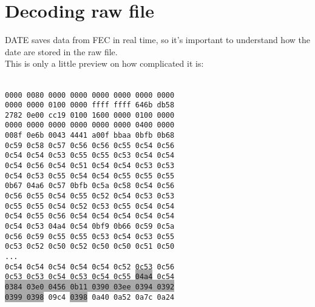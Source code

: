 \documentclass[a4paper,12pt]{article}
\begin{document}
 	\section{Decoding raw file}
 		DATE saves data from FEC in real time, so it's important to understand how the date are stored in the raw file.\\
 		This is only a little preview on how complicated it is:\\
 		\vspace{0.2cm}\\
 		{\scriptsize
 		\begin{minipage}[c]{0.49\textwidth}
			\texttt{0000 0080 0000 0000 0000 0000 0000 0000\\
			0000 0000 0100 0000 ffff ffff 646b db58\\
			2782 0e00 cc19 0100 1600 0000 0100 0000\\
			0000 0000 0000 0000 0000 0000 0400 0000\\
			008f 0e6b {\color{lime}00}{\color{blue}43 4441} {\color{pink}a00f bbaa} {\color{red}0bfb 0b68\\
			0c59 0c58 0c57 0c56 0c56 0c55 0c54 0c56\\
			0c54 0c54 0c53 0c55 0c55 0c53 0c54 0c54\\
			0c54 0c56 0c54 0c51 0c54 0c54 0c53 0c53\\
			0c54 0c53 0c55 0c54 0c54 0c55 0c55 0c55\\
			0b67} {\color{green}04a6} {\color{red}0c57 0bfb 0c5a 0c58 0c54 0c56\\
			0c56 0c55 0c54 0c55 0c52 0c54 0c53 0c53\\
			0c55 0c55 0c54 0c52 0c53 0c55 0c54 0c54\\
			0c54 0c55 0c56 0c54 0c54 0c54 0c54 0c54\\
			0c54 0c53} {\color{green}04a4} {\color{red}0c54 0bf9 0b66 0c59 0c5a\\
			0c56 0c59 0c55 0c55 0c53 0c54 0c53 0c55\\
			0c53 0c52 0c50 0c52 0c50 0c50 0c51 0c50\\
			...\\
			0c54 0c54 0c54 0c54 0c54 0c52 0c53 0c56\\
			0c53 0c53 0c54 0c53 0c54 0c55} \colorbox{darkgray}{\color{green}04a4} {\color{red}0c54}\\
			\colorbox{darkgray}{{\color{green}0384 03e0 0456} {\color{red}0b11} {\color{green}0390 03ee 0394 0392}}\\
			\colorbox{darkgray}{\color{green}0399 0398} {\color{yellow}09c4} \colorbox{darkgray}{\color{green}0398} {\color{yellow}0a40 0a52 0a7c 0a24\\
}}
\end{minipage}}
\end{document}
